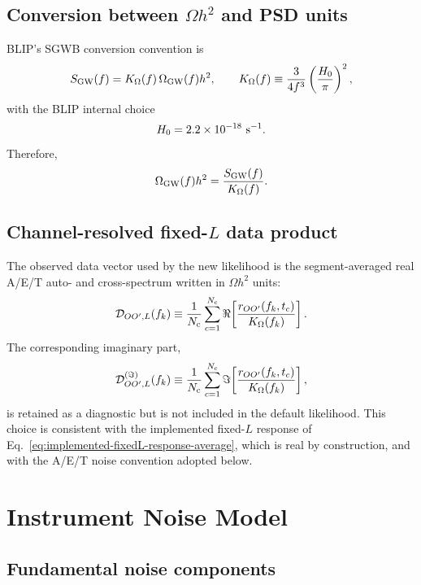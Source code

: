 \documentclass[11pt]{article}
\newcommand{\Om}{\Omega_{\rm GW}}
\newcommand{\Nc}{N_{\rm c}}
\newcommand{\Dobs}{\mathcal{D}}
\newcommand{\sgw}{S_{\rm GW}}
\newcommand{\OO}{OO^\prime}
\begin{document}
\subsection{Conversion between $\Omega h^2$ and PSD units}

BLIP's SGWB conversion convention is
\begin{equation}
  \sgw(f)
  =
  K_{\Omega}(f)\,\Om(f)h^2,
  \qquad
  K_{\Omega}(f)
  \equiv
  \frac{3}{4f^3}
  \left(\frac{H_0}{\pi}\right)^2,
  \label{eq:omega-psd-conversion}
\end{equation}
with the BLIP internal choice
\begin{equation}
  H_0 = 2.2\times 10^{-18}\ {\rm s}^{-1}.
\end{equation}
Therefore,
\begin{equation}
  \Om(f)h^2 = \frac{\sgw(f)}{K_{\Omega}(f)}.
  \label{eq:psd-omega-conversion}
\end{equation}

\subsection{Channel-resolved fixed-$L$ data product}

The observed data vector used by the new likelihood is the segment-averaged real A/E/T auto- and cross-spectrum written in $\Omega h^2$ units:
\begin{equation}
  \Dobs_{\OO,L}(f_k)
  \equiv
  \frac{1}{\Nc}
  \sum_{c=1}^{\Nc}
  \Re\!\left[
    \frac{r_{\OO}(f_k,t_c)}{K_{\Omega}(f_k)}
  \right].
  \label{eq:data-product}
\end{equation}
The corresponding imaginary part,
\begin{equation}
  \Dobs^{(\Im)}_{\OO,L}(f_k)
  \equiv
  \frac{1}{\Nc}
  \sum_{c=1}^{\Nc}
  \Im\!\left[
    \frac{r_{\OO}(f_k,t_c)}{K_{\Omega}(f_k)}
  \right],
\end{equation}
is retained as a diagnostic but is not included in the default likelihood.  This choice is consistent with the implemented fixed-$L$ response of Eq.~\eqref{eq:implemented-fixedL-response-average}, which is real by construction, and with the A/E/T noise convention adopted below.

\section{Instrument Noise Model}

\subsection{Fundamental noise components}
\end{document}
